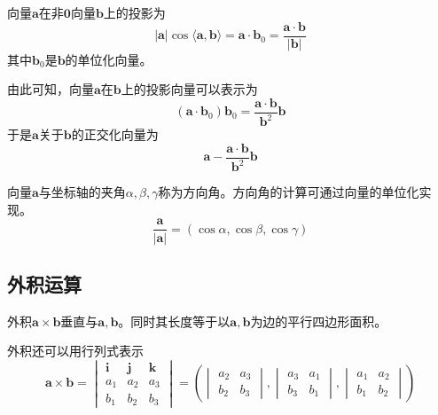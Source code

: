 向量$\bm{a}$在非$\bm{0}$向量$\bm{b}$上的投影为
\begin{equation}
    |\bm{a}|\cos\langle\bm{a},\bm{b}\rangle = \bm{a}\cdot\bm{b}_0 = \frac{\bm{a}\cdot\bm{b}}{|\bm{b}|}
\end{equation}
其中$\bm{b}_0$是$\bm{b}$的单位化向量。

由此可知，向量$\bm{a}$在$\bm{b}$上的投影向量可以表示为
\begin{equation}
    (\bm{a}\cdot\bm{b}_0)\bm{b}_0 = \frac{\bm{a}\cdot\bm{b}}{\bm{b}^2}\bm{b}
\end{equation}
于是$\bm{a}$关于$\bm{b}$的正交化向量为
\begin{equation}
    \bm{a} - \frac{\bm{a}\cdot\bm{b}}{\bm{b}^2}\bm{b}
\end{equation}

向量$\bm{a}$与坐标轴的夹角$\alpha,\beta,\gamma$称为方向角。方向角的计算可通过向量的单位化实现。
\begin{equation}
    \frac{\bm{a}}{|\bm{a}|} = (\cos\alpha,\cos\beta,\cos\gamma)
\end{equation}

\subsection{外积运算}
外积$\bm{a}\times\bm{b}$垂直与$\bm{a},\bm{b}$。同时其长度等于以$\bm{a},\bm{b}$为边的平行四边形面积。

外积还可以用行列式表示
\begin{equation}
    \bm{a}\times\bm{b} =
    \begin{vmatrix}
        \bm{i} & \bm{j} & \bm{k} \\
        a_1    & a_2    & a_3    \\
        b_1    & b_2    & b_3
    \end{vmatrix}
    =
    \left(
    \begin{vmatrix}
            a_2 & a_3 \\
            b_2 & b_3
        \end{vmatrix},
    \begin{vmatrix}
            a_3 & a_1 \\
            b_3 & b_1
        \end{vmatrix},
    \begin{vmatrix}
            a_1 & a_2 \\
            b_1 & b_2
        \end{vmatrix}
    \right)
\end{equation}

